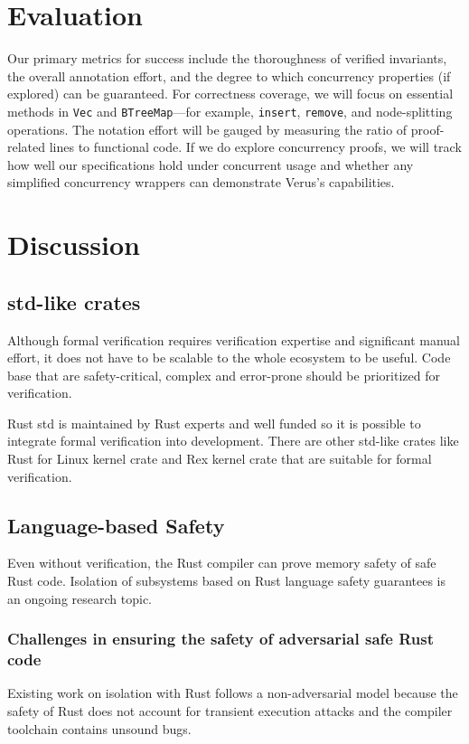 \documentclass[conference]{IEEEtran}
\begin{document}
\section{Evaluation}
Our primary metrics for success include the thoroughness of verified invariants, the overall annotation effort, and the degree to which concurrency properties (if explored) can be guaranteed. For correctness coverage, we will focus on essential methods in \texttt{Vec} and \texttt{BTreeMap}—for example, \texttt{insert}, \texttt{remove}, and node-splitting operations. The notation effort will be gauged by measuring the ratio of proof-related lines to functional code. If we do explore concurrency proofs, we will track how well our specifications hold under concurrent usage and whether any simplified concurrency wrappers can demonstrate Verus’s capabilities.

\section{Discussion}
\subsection{std-like crates}
Although formal verification requires verification expertise and significant manual effort, it does not have to be scalable to the whole ecosystem to be useful. Code base that are safety-critical, complex and error-prone should be prioritized for verification. 

Rust std is maintained by Rust experts and well funded so it is possible to integrate formal verification into development.
There are other std-like crates like Rust for Linux\cite{Rust_for_Linux} kernel crate and Rex\cite{rax} kernel crate that are suitable for formal verification.  
\subsection{Language-based Safety}
Even without verification, the Rust compiler can prove memory safety of safe Rust code. Isolation of subsystems based on Rust language safety guarantees\cite{Theusus,Redleaf,TockOS,rax} is an ongoing research topic. 

\subsubsection{Challenges in ensuring the safety of adversarial safe Rust code}
Existing work on isolation with Rust follows a non-adversarial model because the safety of Rust does not account for transient execution attacks and the compiler toolchain contains unsound bugs.   
\end{document}
